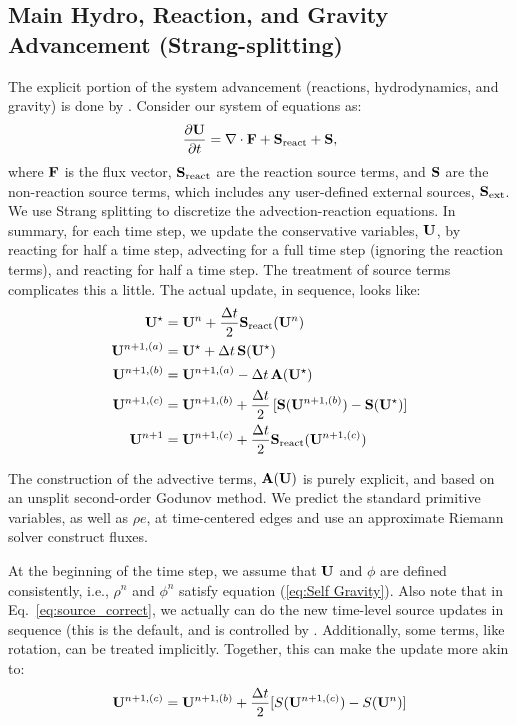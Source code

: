 \subsection{Main Hydro, Reaction, and Gravity Advancement (Strang-splitting)}

The explicit portion of the system advancement (reactions,
hydrodynamics, and gravity) is done by .  
Consider our system of equations as:
\begin{equation}
\frac{\partial{\bf U}}{\partial t} = \nabla\cdot{\bf F} + {\bf S}_{\rm react} + {\bf S},
\end{equation}
where ${\bf F}$ is the flux vector, ${\bf S}_{\rm react}$ are the reaction
source terms, and ${\bf S}$ are the non-reaction source terms, which
includes any user-defined external sources, ${\bf S}_{\rm ext}$.  We use
Strang splitting to discretize the advection-reaction equations.  In
summary, for each time step, we update the conservative variables,
${\bf U}$, by reacting for half a time step, advecting for a full time
step (ignoring the reaction terms), and reacting for half a time step.
The treatment of source terms complicates this a little.  The actual
update, in sequence, looks like:
\begin{align}
{\bf U}^\star &= {\bf U}^n + \frac{\Delta t}{2}{\bf S}_{\rm react}({\bf U}^n) \\
{\bf U}^{n+1,(a)} &= {\bf U}^\star + \Delta t\, {\bf S}({\bf U}^\star) \\
{\bf U}^{n+1,(b)} &= {\bf U}^{n+1,(a)} - \Delta t\, {\bf A}({\bf U}^\star) \\
{\bf U}^{n+1,(c)} &= {\bf U}^{n+1,(b)} + \frac{\Delta t}{2}\, [{\bf S}({\bf U}^{n+1,(b)}) - {\bf S}({\bf U}^\star)] \label{eq:source_correct}\\
{\bf U}^{n+1}     &= {\bf U}^{n+1,(c)} + \frac{\Delta t}{2} {\bf S}_{\rm react}({\bf U}^{n+1,(c)})
\end{align}

The construction of the advective terms, ${\bf A({\bf U})}$ is purely
explicit, and based on an unsplit second-order Godunov method.  We
predict the standard primitive variables, as well as $\rho e$, at
time-centered edges and use an approximate Riemann solver construct
fluxes.

At the beginning of the time step, we assume that ${\bf U}$ and $\phi$ are
defined consistently, i.e., $\rho^n$ and $\phi^n$ satisfy equation
(\ref{eq:Self Gravity}).  Also note that in
Eq.~\ref{eq:source_correct}, we actually can do the new time-level
source updates in sequence (this is the default, and is controlled by
.  Additionally, some
terms, like rotation, can be treated implicitly.  Together, this can
make the update more akin to:
\begin{equation}
{\bf U}^{n+1,(c)} = {\bf U}^{n+1,(b)} + \frac{\Delta t}{2} [S({\bf U}^{n+1,(c)}) - S({\bf U}^n)]
\end{equation}

